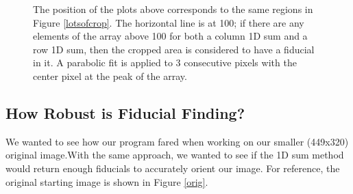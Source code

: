 \documentclass[10pt]{scrartcl}
\begin{document}
\begin{figure}[!ht]
\begin{subfigure}[b]{.3\linewidth}
    \end{subfigure}
    \caption{The position of the plots above corresponds to the same regions in Figure \ref{lotsofcrop}. The horizontal line is at 100; if there are any elements of the array above 100 for both a column 1D sum and a row 1D sum, then the cropped area is considered to have a fiducial in it. A parabolic fit is applied to 3 consecutive pixels with the center pixel at the peak of the array.}
    \label{lotsofplot}
\end{figure}

\subsection{How Robust is Fiducial Finding?} %
\label{sub:how_robust_is_fiducial_finding_}
    We wanted to see how our program fared when working on our smaller (449x320) original image.With the same approach, we wanted to see if the 1D sum method would return enough fiducials to accurately orient our image. For reference, the original starting image is shown in Figure \ref{orig}. 
\end{document}
